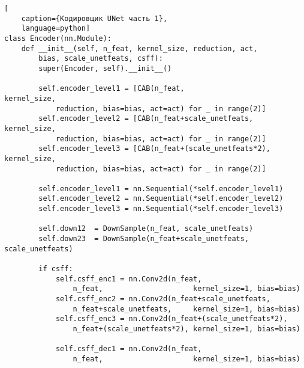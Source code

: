 \begin{lstlisting}[
    caption={Кодировщик UNet часть 1},
    language=python]
class Encoder(nn.Module):
    def __init__(self, n_feat, kernel_size, reduction, act, 
        bias, scale_unetfeats, csff):
        super(Encoder, self).__init__()

        self.encoder_level1 = [CAB(n_feat,                     kernel_size, 
            reduction, bias=bias, act=act) for _ in range(2)]
        self.encoder_level2 = [CAB(n_feat+scale_unetfeats,     kernel_size, 
            reduction, bias=bias, act=act) for _ in range(2)]
        self.encoder_level3 = [CAB(n_feat+(scale_unetfeats*2), kernel_size, 
            reduction, bias=bias, act=act) for _ in range(2)]

        self.encoder_level1 = nn.Sequential(*self.encoder_level1)
        self.encoder_level2 = nn.Sequential(*self.encoder_level2)
        self.encoder_level3 = nn.Sequential(*self.encoder_level3)

        self.down12  = DownSample(n_feat, scale_unetfeats)
        self.down23  = DownSample(n_feat+scale_unetfeats, scale_unetfeats)

        if csff:
            self.csff_enc1 = nn.Conv2d(n_feat,                     
                n_feat,                     kernel_size=1, bias=bias)
            self.csff_enc2 = nn.Conv2d(n_feat+scale_unetfeats,     
                n_feat+scale_unetfeats,     kernel_size=1, bias=bias)
            self.csff_enc3 = nn.Conv2d(n_feat+(scale_unetfeats*2), 
                n_feat+(scale_unetfeats*2), kernel_size=1, bias=bias)

            self.csff_dec1 = nn.Conv2d(n_feat,                     
                n_feat,                     kernel_size=1, bias=bias)
\end{lstlisting}

